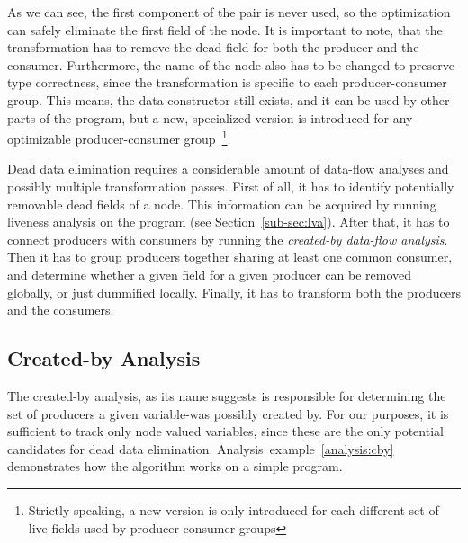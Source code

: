 \documentclass[main.tex]{subfiles}
\begin{document}
	As we can see, the first component of the pair is never used, so the optimization can safely eliminate the first field of the node. It is important to note, that the transformation has to remove the dead field for both the producer and the consumer. Furthermore, the name of the node also has to be changed to preserve type correctness, since the transformation is specific to each producer-consumer group. This means, the data constructor  still exists, and it can be used by other parts of the program, but a new, specialized version is introduced for any optimizable producer-consumer group~\footnote{Strictly speaking, a new version is only introduced for each different set of live fields used by producer-consumer groups}.
	
	Dead data elimination requires a considerable amount of data-flow analyses and possibly multiple transformation passes. First of all, it has to identify potentially removable dead fields of a node. This information can be acquired by running liveness analysis on the program (see Section~\ref{sub-sec:lva}). After that, it has to connect producers with consumers by running the \emph{created-by data-flow analysis}. Then it has to group producers together sharing at least one common consumer, and determine whether a given field for a given producer can be removed globally, or just dummified locally. Finally, it has to transform both the producers and the consumers.
	
	\subsection{Created-by Analysis}
	
	The created-by analysis, as its name suggests is responsible for determining the set of producers a given variable-was possibly created by. For our purposes, it is sufficient to track only node valued variables, since these are the only potential candidates for dead data elimination. Analysis~example~\ref{analysis:cby} demonstrates how the algorithm works on a simple program.
	
\end{document}
